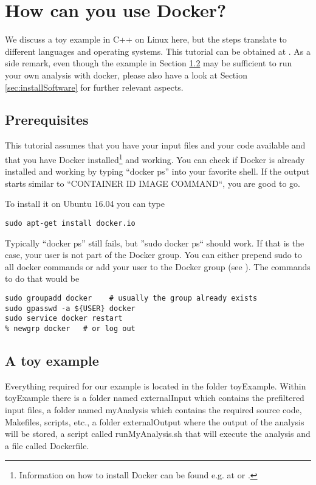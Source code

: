 \documentclass[a4paper, twoside, 11pt]{article}
\begin{document}
\section{How can you use Docker?}

We discuss a toy example in C++ on Linux here, 
but the steps translate to different languages and operating systems. 
This tutorial can be obtained at \cite{gith:tutorial}. 
As a side remark, even though the example in Section \ref{sec:toyexample} 
may be sufficient to run your own analysis with docker, 
please also have a look at Section \ref{sec:installSoftware}  
for further relevant aspects.

\subsection{Prerequisites}
\label{sec:isDockerRunning}

This tutorial assumes that you have your input files and your code available and that you have Docker 
installed\footnote{Information on how to install Docker can be found e.g. at 
\cite{digoc:install}
or \cite{dock:install}
.} and working. 
You can check if Docker is already installed and working by typing ``docker ps'' into your favorite shell. 
If the output starts similar to ``CONTAINER ID \hspace{0.5cm} IMAGE \hspace{0.5cm} COMMAND``, you are good to go. 

To install it on Ubuntu 16.04 you can type 
\begin{lstlisting}[basicstyle=\ttfamily\small,upquote=true,columns=flexible,keepspaces=true,frame=single]
sudo apt-get install docker.io
\end{lstlisting}
\bigskip

Typically ``docker ps'' still fails, but ''sudo docker ps`` should work. 
If that is the case, your user is not part of the Docker group. 
You can either prepend sudo to all docker commands or add your user to the Docker group (see \cite{digoc:install}). 
The commands to do that would be 
\begin{lstlisting}[basicstyle=\ttfamily\small,upquote=true,columns=flexible,keepspaces=true,frame=single]
sudo groupadd docker    # usually the group already exists
sudo gpasswd -a ${USER} docker
sudo service docker restart
% newgrp docker   # or log out
\end{lstlisting}

\subsection{A toy example}
\label{sec:toyexample}
Everything required for our example is located in the folder toyExample. 
Within toyExample there is a folder named externalInput which contains the prefiltered input files, 
a folder named myAnalysis which contains the required source code, Makefiles, scripts, etc., 
a folder externalOutput where the output of the analysis will be stored, 
a script called runMyAnalysis.sh that will execute the analysis and a file called Dockerfile. 
\end{document}
